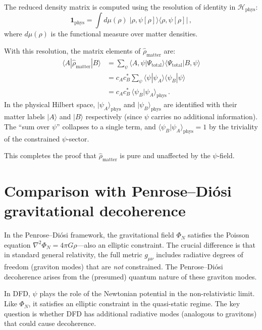 \documentclass[12pt,a4paper]{article}
\theoremstyle{definition}
\theoremstyle{remark}
\newcommand{\Hilb}{\mathcal{H}}
\begin{document}
The reduced density matrix is computed using the resolution of identity
in $\Hilb_{\mathrm{phys}}$:
\begin{equation}
\mathbf{1}_{\mathrm{phys}} = \int d\mu(\rho)\;|\rho,\psi[\rho]\rangle\langle\rho,\psi[\rho]|\,,
\end{equation}
where $d\mu(\rho)$ is the functional measure over matter densities.

With this resolution, the matrix elements of $\hat{\rho}_{\mathrm{matter}}$ are:
\begin{align}
\langle A|\hat{\rho}_{\mathrm{matter}}|B\rangle
&= \sum_\psi \langle A,\psi|\Psi_{\mathrm{total}}\rangle
\langle\Psi_{\mathrm{total}}|B,\psi\rangle \nonumber\\
&= c_A c_B^* \sum_\psi \langle\psi|\psi_A\rangle\langle\psi_B|\psi\rangle \nonumber\\
&= c_A c_B^* \,\langle\psi_B|\psi_A\rangle_{\mathrm{phys}}\,.
\end{align}
In the physical Hilbert space, $|\psi_A\rangle_{\mathrm{phys}}$ and
$|\psi_B\rangle_{\mathrm{phys}}$ are identified with their matter labels
$|A\rangle$ and $|B\rangle$ respectively (since $\psi$ carries no additional
information).  The ``sum over $\psi$'' collapses to a single term, and
$\langle\psi_B|\psi_A\rangle_{\mathrm{phys}} = 1$ by the triviality of the
constrained $\psi$-sector.

This completes the proof that $\hat{\rho}_{\mathrm{matter}}$ is pure and
unaffected by the $\psi$-field.

\section{Comparison with Penrose--Di\'osi gravitational decoherence}
\label{app:penrose}

In the Penrose--Di\'osi framework, the gravitational field $\Phi_N$ satisfies
the Poisson equation $\nabla^2\Phi_N = 4\pi G\rho$---also an elliptic
constraint.  The crucial difference is that in standard general relativity,
the full metric $g_{\mu\nu}$ includes radiative degrees of freedom (graviton
modes) that are \emph{not} constrained.  The Penrose--Di\'osi decoherence
arises from the (presumed) quantum nature of these graviton modes.

In DFD, $\psi$ plays the role of the Newtonian potential in the non-relativistic
limit.  Like $\Phi_N$, it satisfies an elliptic constraint in the quasi-static
regime.  The key question is whether DFD has additional radiative modes (analogous
to gravitons) that could cause decoherence.
\end{document}
